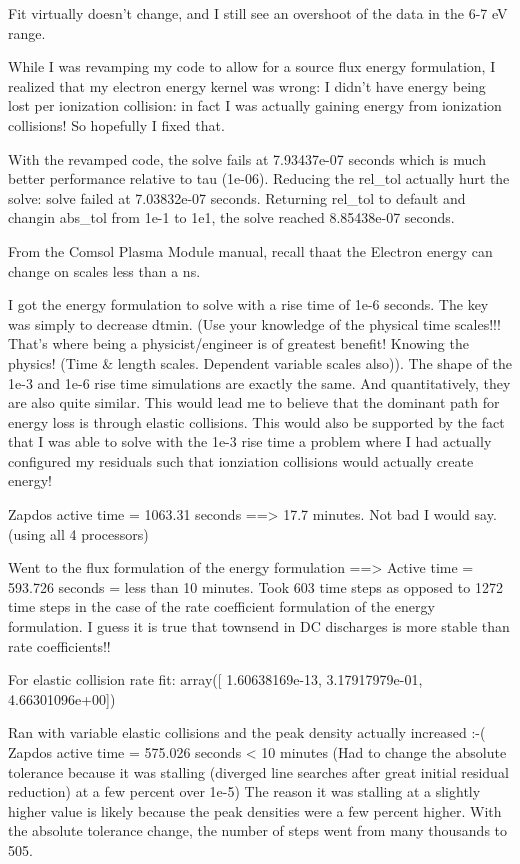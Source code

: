 {Fit virtually doesn't change, and I still see an overshoot of the data in the 6-7 eV range.

While I was revamping my code to allow for a source flux energy formulation, I realized that my electron energy kernel was wrong: I didn't have energy being lost per ionization collision: in fact I was actually gaining energy from ionization collisions! So hopefully I fixed that.

With the revamped code, the solve fails at 7.93437e-07 seconds which is much better performance relative to tau (1e-06). Reducing the rel_tol actually hurt the solve: solve failed at 7.03832e-07 seconds. Returning rel_tol to default and changin abs_tol from 1e-1 to 1e1, the solve reached 8.85438e-07 seconds.

From the Comsol Plasma Module manual, recall thaat the Electron energy can change on scales less than a ns.

I got the energy formulation to solve with a rise time of 1e-6 seconds. The key was simply to decrease dtmin. (Use your knowledge of the physical time scales!!! That's where being a physicist/engineer is of greatest benefit! Knowing the physics! (Time & length scales. Dependent variable scales also)). The shape of the 1e-3 and 1e-6 rise time simulations are exactly the same. And quantitatively, they are also quite similar. This would lead me to believe that the dominant path for energy loss is through elastic collisions. This would also be supported by the fact that I was able to solve with the 1e-3 rise time a problem where I had actually configured my residuals such that ionziation collisions would actually create energy!

Zapdos active time = 1063.31 seconds ==> 17.7 minutes. Not bad I would say. (using all 4 processors)

Went to the flux formulation of the energy formulation ==> Active time = 593.726 seconds = less than 10 minutes. Took 603 time steps as opposed to 1272 time steps in the case of the rate coefficient formulation of the energy formulation. I guess it is true that townsend in DC discharges is more stable than rate coefficients!!

For elastic collision rate fit:
array([  1.60638169e-13,   3.17917979e-01,   4.66301096e+00])

Ran with variable elastic collisions and the peak density actually increased :-( Zapdos active time = 575.026 seconds < 10 minutes (Had to change the absolute tolerance because it was stalling (diverged line searches after great initial residual reduction) at a few percent over 1e-5) The reason it was stalling at a slightly higher value is likely because the peak densities were a few percent higher. With the absolute tolerance change, the number of steps went from many thousands to 505.

}
